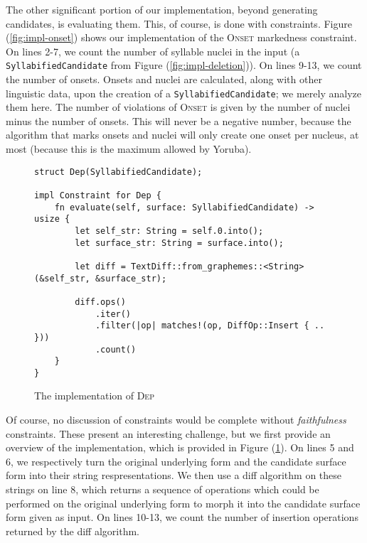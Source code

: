 \documentclass[12pt]{article}
\newcommand{\dep}{\textsc{Dep}}
\newcommand{\onset}{\textsc{Onset}}
\newcommand{\pref}[1]{(\ref{#1})}
\begin{document}
The other significant portion of our implementation, beyond generating
candidates, is evaluating them. This, of course, is done with constraints.
Figure \pref{fig:impl-onset} shows our implementation of the \onset{}
markedness constraint. On lines 2-7, we count the number of syllable
nuclei in the input (a \texttt{SyllabifiedCandidate} from Figure
\pref{fig:impl-deletion}). On lines 9-13, we count the number of onsets.
Onsets and nuclei are calculated, along with other linguistic data, upon
the creation of a \texttt{SyllabifiedCandidate}; we merely analyze them
here. The number of violations of \onset{} is given by the number of
nuclei minus the number of onsets. This will never be a negative number,
because the algorithm that marks onsets and nuclei will only create one
onset per nucleus, at most (because this is the maximum allowed by
Yoruba).

\begin{figure}[h]
\caption{The implementation of \dep}
\label{fig:impl-dep}
\begin{verbatim}
struct Dep(SyllabifiedCandidate);

impl Constraint for Dep {
    fn evaluate(self, surface: SyllabifiedCandidate) -> usize {
        let self_str: String = self.0.into();
        let surface_str: String = surface.into();

        let diff = TextDiff::from_graphemes::<String>(&self_str, &surface_str);

        diff.ops()
            .iter()
            .filter(|op| matches!(op, DiffOp::Insert { .. }))
            .count()
    }
}
\end{verbatim}
\end{figure}

Of course, no discussion of constraints would be complete without
\textit{faithfulness} constraints. These present an interesting challenge,
but we first provide an overview of the implementation, which is provided
in Figure \pref{fig:impl-dep}. On lines 5 and 6, we respectively turn the
original underlying form and the candidate surface form into their string
respresentations. We then use a diff algorithm on these strings on line 8,
which returns a sequence of operations which could be performed on the
original underlying form to morph it into the candidate surface form given
as input. On lines 10-13, we count the number of insertion operations
returned by the diff algorithm.
\end{document}
